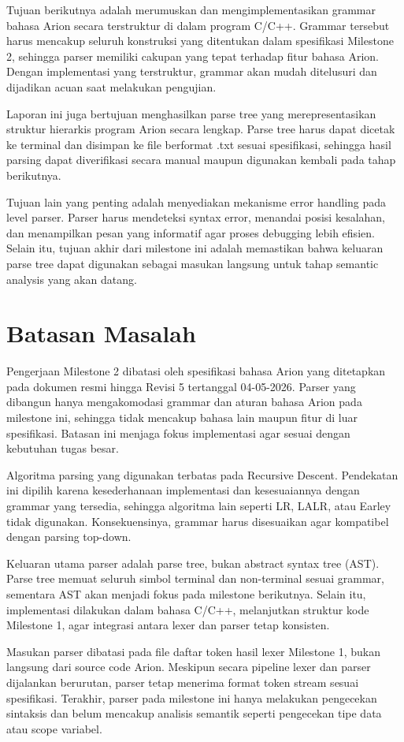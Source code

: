 Tujuan berikutnya adalah merumuskan dan mengimplementasikan grammar bahasa Arion secara 
terstruktur di dalam program C/C++. Grammar tersebut harus mencakup seluruh konstruksi 
yang ditentukan dalam spesifikasi Milestone 2, sehingga parser memiliki cakupan yang 
tepat terhadap fitur bahasa Arion. Dengan implementasi yang terstruktur, grammar akan 
mudah ditelusuri dan dijadikan acuan saat melakukan pengujian.

Laporan ini juga bertujuan menghasilkan parse tree yang merepresentasikan struktur 
hierarkis program Arion secara lengkap. Parse tree harus dapat dicetak ke terminal 
dan disimpan ke file berformat .txt sesuai spesifikasi, sehingga hasil parsing 
dapat diverifikasi secara manual maupun digunakan kembali pada tahap berikutnya.

Tujuan lain yang penting adalah menyediakan mekanisme error handling pada level parser. 
Parser harus mendeteksi syntax error, menandai posisi kesalahan, dan menampilkan 
pesan yang informatif agar proses debugging lebih efisien. Selain itu, tujuan 
akhir dari milestone ini adalah memastikan bahwa keluaran parse tree dapat digunakan 
sebagai masukan langsung untuk tahap semantic analysis yang akan datang.

\section{Batasan Masalah}
Pengerjaan Milestone 2 dibatasi oleh spesifikasi bahasa Arion yang ditetapkan pada 
dokumen resmi hingga Revisi 5 tertanggal 04-05-2026. Parser yang dibangun hanya 
mengakomodasi grammar dan aturan bahasa Arion pada milestone ini, sehingga tidak 
mencakup bahasa lain maupun fitur di luar spesifikasi. Batasan ini menjaga fokus 
implementasi agar sesuai dengan kebutuhan tugas besar.

Algoritma parsing yang digunakan terbatas pada Recursive Descent. Pendekatan ini 
dipilih karena kesederhanaan implementasi dan kesesuaiannya dengan grammar yang 
tersedia, sehingga algoritma lain seperti LR, LALR, atau Earley tidak digunakan. 
Konsekuensinya, grammar harus disesuaikan agar kompatibel dengan parsing top-down.

Keluaran utama parser adalah parse tree, bukan abstract syntax tree (AST). Parse 
tree memuat seluruh simbol terminal dan non-terminal sesuai grammar, sementara 
AST akan menjadi fokus pada milestone berikutnya. Selain itu, implementasi dilakukan 
dalam bahasa C/C++, melanjutkan struktur kode Milestone 1, agar integrasi antara 
lexer dan parser tetap konsisten.

Masukan parser dibatasi pada file daftar token hasil lexer Milestone 1, bukan langsung 
dari source code Arion. Meskipun secara pipeline lexer dan parser dijalankan berurutan, 
parser tetap menerima format token stream sesuai spesifikasi. Terakhir, parser pada 
milestone ini hanya melakukan pengecekan sintaksis dan belum mencakup analisis semantik 
seperti pengecekan tipe data atau scope variabel.
